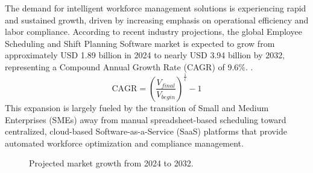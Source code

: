 The demand for intelligent workforce management solutions is experiencing rapid and sustained growth, driven by increasing emphasis on operational efficiency and labor compliance. According to recent industry projections, the global Employee Scheduling and Shift Planning Software market is expected to grow from approximately USD 1.89 billion in 2024 to nearly USD 3.94 billion by 2032, representing a Compound Annual Growth Rate (CAGR) of 9.6\%. \cite{SchedulingMarket2024}.\begin{equation}
\text{CAGR} = \left( \frac{V_{final}}{V_{begin}} \right)^{\frac{1}{t}} - 1
\end{equation}
This expansion is largely fueled by the transition of Small and Medium Enterprises (SMEs) away from manual spreadsheet-based scheduling toward centralized, cloud-based Software-as-a-Service (SaaS) platforms that provide automated workforce optimization and compliance management.

\begin{figure}[H]
    \centering
    \caption{Projected market growth from 2024 to 2032.}
    \label{fig:market_growth_projection}
\end{figure}

